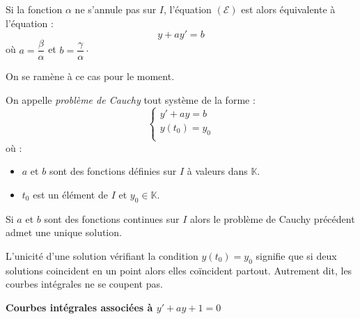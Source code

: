 \documentclass[a4paper,10pt]{report}
\begin{document}
\noindent Si la fonction $\alpha$ ne s'annule pas sur $I$, l'équation $(\mathcal{E})$ est alors équivalente à l'équation :
$$ y+ay'=b$$
où $a = \dfrac{\beta}{\alpha}$ et $b = \dfrac{\gamma}{\alpha} \cdot$

\medskip

\noindent On se ramène à ce cas pour le moment.

\begin{defin} On appelle \textit{problème de Cauchy} tout système de la forme :
$$ \left\lbrace \begin{array}{ccl}
y'+ay=b \\
y(t_0)=y_0 \\
\end{array}\right.$$
où :
\begin{itemize}
\item $a$ et $b$ sont des fonctions définies sur $I$ à valeurs dans $\mathbb{K}$.
\item $t_0$ est un élément de $I$ et $y_0 \in \mathbb{K}$.
\end{itemize}
\end{defin}

\begin{thm} Si $a$ et $b$ sont des fonctions continues sur $I$ alors le problème de Cauchy précédent admet une unique solution.
\end{thm}

\begin{rem} L'unicité d'une solution vérifiant la condition $y(t_0)=y_0$ signifie que si deux solutions coincident en un point alors elles coïncident partout. Autrement dit, les courbes intégrales ne se coupent pas.
\end{rem}

\pagebreak

\begin{center}
\textbf{Courbes intégrales associées à $y'+ay+1=0$ }
\end{center}
\end{document}

